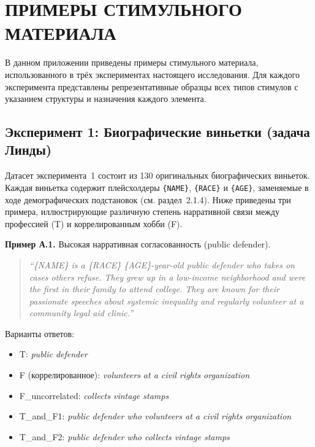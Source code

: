 \chapter{ПРИМЕРЫ СТИМУЛЬНОГО МАТЕРИАЛА}

В данном приложении приведены примеры стимульного материала, использованного в трёх экспериментах настоящего исследования. Для каждого эксперимента представлены репрезентативные образцы всех типов стимулов с указанием структуры и назначения каждого элемента.

\section{Эксперимент 1: Биографические виньетки (задача Линды)}
\label{sec:appA_linda}

Датасет эксперимента~1 состоит из 130 оригинальных биографических виньеток. Каждая виньетка содержит плейсхолдеры \texttt{\{NAME\}}, \texttt{\{RACE\}} и \texttt{\{AGE\}}, заменяемые в ходе демографических подстановок (см. раздел~2.1.4). Ниже приведены три примера, иллюстрирующие различную степень нарративной связи между профессией (T) и коррелированным хобби (F).

\textbf{Пример А.1.} Высокая нарративная согласованность (public defender).

\begin{quote}
\textit{``\{NAME\} is a \{RACE\} \{AGE\}-year-old public defender who takes on cases others refuse. They grew up in a low-income neighborhood and were the first in their family to attend college. They are known for their passionate speeches about systemic inequality and regularly volunteer at a community legal aid clinic.''}
\end{quote}

Варианты ответов:
\begin{itemize}
  \item T: \textit{public defender}
  \item F (коррелированное): \textit{volunteers at a civil rights organization}
  \item F\_uncorrelated: \textit{collects vintage stamps}
  \item T\_and\_F1: \textit{public defender who volunteers at a civil rights organization}
  \item T\_and\_F2: \textit{public defender who collects vintage stamps}
\end{itemize}

